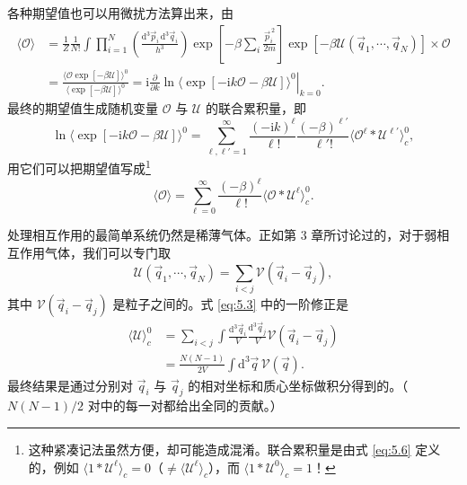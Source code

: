 各种期望值也可以用微扰方法算出来，由
\begin{equation}\label{eq:5.5}
\begin{aligned}
\langle\mathcal O\rangle&=\frac1Z\frac{1}{N!}\int\prod_{i=1}^N\left(\frac{\mathrm{d}^3\vec p_i\,\mathrm{d}^3\vec q_i}{h^3}\right)\exp\left[-\beta\sum_i\frac{\vec p_i^{\,2}}{2m}\right]\exp\left[-\beta\mathcal U(\vec q_1,\cdots,\vec q_N)\right]\times\mathcal O\\
&=\frac{\big\langle\mathcal O\exp[-\beta\mathcal U]\big\rangle^0}{\big\langle\exp[-\beta\mathcal U]\big\rangle^0}=\mathrm{i}\left.\frac{\partial}{\partial k}\ln\big\langle\exp[-\mathrm{i}k\mathcal O-\beta\mathcal U]\big\rangle^0\right|_{k=0}.
\end{aligned}
\end{equation}
最终的期望值生成随机变量 $\mathcal O$ 与 $\mathcal U$ 的联合累积量，即
\begin{equation}\label{eq:5.6}
\ln\big\langle\exp[-\mathrm{i}k\mathcal O-\beta\mathcal U]\big\rangle^0=\sum_{\ell,\ell'=1}^\infty\frac{(-\mathrm{i}k)^\ell}{\ell!}\frac{(-\beta)^{\ell'}}{\ell'!}\big\langle\mathcal O^\ell\ast\mathcal U^{\ell'}\big\rangle_c^0,
\end{equation}
用它们可以把期望值写成\footnote{这种紧凑记法虽然方便，却可能造成混淆。联合累积量是由式 \eqref{eq:5.6} 定义的，例如 $\langle 1\ast\mathcal U^\ell\rangle_c=0$（$\neq\langle\mathcal U^\ell\rangle_c$），而 $\langle 1\ast\mathcal U^0\rangle_c=1$！}
\begin{equation}\label{eq:5.7}
\langle\mathcal O\rangle=\sum_{\ell=0}^\infty\frac{(-\beta)^\ell}{\ell!}\big\langle\mathcal O\ast\mathcal U^\ell\big\rangle_c^0.
\end{equation}

处理相互作用的最简单系统仍然是稀薄气体。正如第 3 章所讨论过的，对于弱相互作用气体，我们可以专门取
\begin{equation}\label{eq:5.8}
\mathcal U(\vec q_1,\cdots,\vec q_N)=\sum_{i<j}\mathscr V(\vec q_i-\vec q_j),
\end{equation}
其中 $\mathscr V(\vec q_i-\vec q_j)$ 是粒子之间的。式 \eqref{eq:5.3} 中的一阶修正是
\begin{equation}\label{eq:5.9}
\begin{aligned}
\langle\mathcal U\rangle_c^0&=\sum_{i<j}\int\frac{\mathrm{d}^3\vec q_i}{V}\frac{\mathrm{d}^3\vec q_j}{V}\mathscr V(\vec q_i-\vec q_j)\\
&=\frac{N(N-1)}{2V}\int\mathrm{d}^3\vec q\,\mathscr V(\vec q).
\end{aligned}
\end{equation}
最终结果是通过分别对 $\vec q_i$ 与 $\vec q_j$ 的相对坐标和质心坐标做积分得到的。（$N(N-1)/2$ 对中的每一对都给出全同的贡献。）

